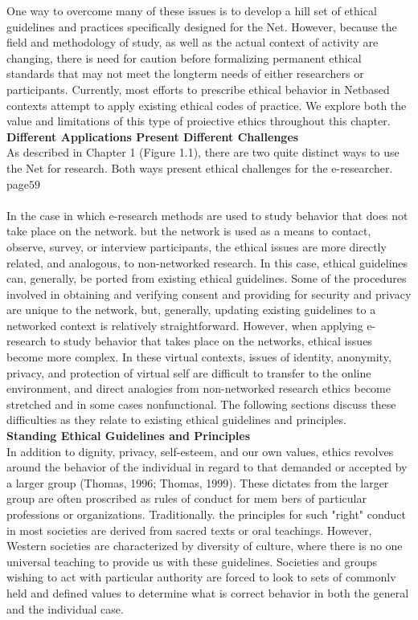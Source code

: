 \documentclass{book}
\begin{document}
One way to overcome many of these issues is to develop a hill set of ethical guidelines and practices specifically designed for the Net. However, because the field and methodology of study, as well as the actual context of activity are changing, there is need for caution before formalizing permanent ethical standards that may not meet the longterm needs of either researchers or participants. Currently, most efforts to prescribe ethical behavior in Netbased contexts attempt to apply existing ethical codes of practice. We explore both the value and limitations of this type of proiective ethics throughout this chapter.\\
\textbf{Different Applications Present Different Challenges} \\
 As described in Chapter 1 (Figure 1.1), there are two quite distinct ways to use the Net for research. Both ways present ethical challenges for the e-researcher.\newpage
 page$59$\\\\
 In the case in which e-research methods are used to study behavior that does not take place on the network. but the network is used as a means to contact, observe, survey, or interview participants, the ethical issues are more directly related, and analogous, to non-networked research. In this case, ethical guidelines can, generally, be ported from existing ethical guidelines. Some of the procedures involved in obtaining and verifying consent and providing for security and privacy are unique to the network, but, generally, updating existing guidelines to a networked context is relatively straightforward. However, when applying e-research to study behavior that takes place on the networks, ethical issues become more complex. In these virtual contexts, issues of identity, anonymity, privacy, and protection of virtual self are difficult to transfer to the online environment, and direct analogies from non-networked research ethics become stretched and in some cases nonfunctional. The following sections discuss these difficulties as they relate to existing ethical guidelines and principles.\\
\textbf{Standing Ethical Guidelines and Principles} \\
In addition to dignity, privacy, self-esteem, and our own values, ethics revolves around the behavior of the individual in regard to that demanded or accepted by a larger group (Thomas, 1996; Thomas, 1999). These dictates from the larger group are often proscribed as rules of conduct for mem bers of particular professions or organizations. Traditionally. the principles for such "right" conduct in most societies are derived from sacred texts or oral teachings. However, Western societies are characterized by diversity of culture, where there is no one universal teaching to provide us with these guidelines. Societies and groups wishing to act with particular authority are forced to look to sets of commonlv held and defined values to determine what is correct behavior in both the general and the individual case.\\
\end{document}
